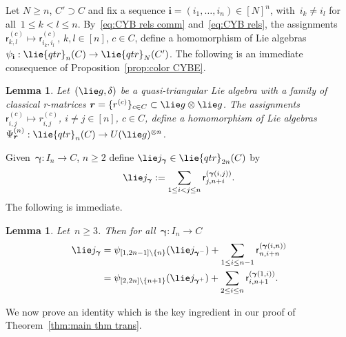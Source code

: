 \documentclass[12pt, reqno]{amsart}
\newtheorem{lemma}[theorem]{Lemma}
\theoremstyle{definition}
\numberwithin{equation}{section}
\newcommand{\tensor}{\otimes}
\newcommand{\sr}[3]{\mathsf r_{#1,#2}^{(#3)}}
\begin{document}
Let $N\ge n$, $C'\supset C$ and fix a sequence $\mathbf i=(i_1,\dots,i_n)\in [N]^n$, with~$i_k\not=i_l$ for all~$1\le k<l\le n$. By~\eqref{eq:CYB rels comm} and~\eqref{eq:CYB rels}, the assignments $\mathsf r_{k,l}^{(c)}\mapsto \mathsf r_{i_k,i_l}^{(c)}$, $k,l\in[n]$, $c\in C$,
define a homomorphism of Lie algebras~$\psi_{\mathbf i}:\lie{qtr}_n(C)\to 
\lie{qtr}_N(C')$.
The following is an immediate consequence of Proposition~\ref{prop:color CYBE}.
\begin{lemma}
Let~$(\lie g,\delta)$ be a quasi-triangular Lie algebra with a family of classical 
r-matrices $\boldsymbol r=\{r^{(c)}\}_{c\in C}\subset \lie g\tensor\lie g$.
The assignments $\sr{i}{j}{c}\mapsto r_{i,j}^{(c)}$, $i\not=j\in[n]$, $c\in C$,
define a homomorphism of Lie algebras~$\Psi_{\boldsymbol r}^{(n)}:
\lie{qtr}_n(C)\to U(\lie g)^{\tensor n}$.
\end{lemma}
Given~$\boldsymbol\gamma:I_n\to C$, $n\ge 2$ define $\lie j_{\boldsymbol\gamma}\in\lie{qtr}_{2n}(C)$
by
\begin{equation}\label{eq:jc defn}
\lie j_{\boldsymbol\gamma}:=\sum_{1\le i<j\le n}
\sr{j}{n+i}{\boldsymbol\gamma(i,j)}.
\end{equation}
The following is immediate.
\begin{lemma}\label{lem:rec class j}
Let~$n\ge 3$. Then
for all~$\boldsymbol\gamma:I_n\to C$
\begin{align}\label{eq:rec jc}
\lie j_{\boldsymbol\gamma}&=\psi_{[1,2n-1]\setminus\{n\}}(\lie j_{\boldsymbol\gamma^-})+
\sum_{1\le i\le n-1}
\sr{n}{i+n}{\boldsymbol\gamma(i,n)}
\\
&=\psi_{[2,2n]\setminus\{n+1\}}(\lie j_{\boldsymbol\gamma^+})+\sum_{2\le i\le n} \sr{i}{n+1}{\boldsymbol\gamma(1,i)}.\label{eq:rec jc-2}
\end{align}
\end{lemma}
We now prove an identity which is the key ingredient in our proof of Theorem~\ref{thm:main thm trans}.
\end{document}
